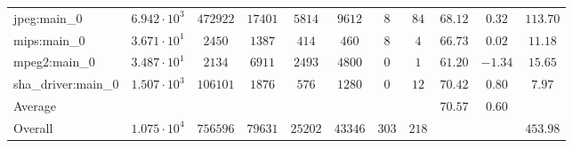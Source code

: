 \begin{tabular}{|l|c|c|c|c|c|c|c|c|c|c|}
jpeg:main\_0            & $ 6.942 \cdot 10^{3} $ & $ 472922 $ & $ 17401 $ & $ 5814  $ & $ 9612  $ & $ 8   $ & $ 84  $ & $ 68.12       $ & $ 0.32    $ & $ 113.70  $ \\
mips:main\_0            & $ 3.671 \cdot 10^{1} $ & $ 2450   $ & $ 1387  $ & $ 414   $ & $ 460   $ & $ 8   $ & $ 4   $ & $ 66.73       $ & $ 0.02    $ & $ 11.18   $ \\
mpeg2:main\_0           & $ 3.487 \cdot 10^{1} $ & $ 2134   $ & $ 6911  $ & $ 2493  $ & $ 4800  $ & $ 0   $ & $ 1   $ & $ 61.20       $ & $ -1.34   $ & $ 15.65   $ \\
sha\_driver:main\_0     & $ 1.507 \cdot 10^{3} $ & $ 106101 $ & $ 1876  $ & $ 576   $ & $ 1280  $ & $ 0   $ & $ 12  $ & $ 70.42       $ & $ 0.80    $ & $ 7.97    $ \\
\hline
Average                 & $                    $ & $        $ & $       $ & $       $ & $       $ & $     $ & $     $ & $ 70.57       $ & $ 0.60    $ & $         $ \\
\hline
Overall                 & $ 1.075 \cdot 10^{4} $ & $ 756596 $ & $ 79631 $ & $ 25202 $ & $ 43346 $ & $ 303 $ & $ 218 $ & $             $ & $         $ & $ 453.98  $ \\
\hline
\end{tabular}
